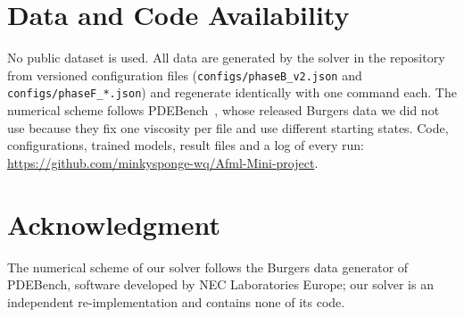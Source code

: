 \section*{Data and Code Availability}
No public dataset is used. All data are generated by the solver in the repository from versioned
configuration files (\texttt{configs/phaseB\_v2.json} and \texttt{configs/phaseF\_*.json}) and regenerate
identically with one command each. The numerical scheme follows PDEBench~\cite{takamoto2022}, whose released
Burgers data we did not use because they fix one viscosity per file and use different starting states.
Code, configurations, trained models, result files and a log of every run:
\url{https://github.com/minkysponge-wq/Afml-Mini-project}.

\section*{Acknowledgment}
The numerical scheme of our solver follows the Burgers data generator of PDEBench, software developed by NEC
Laboratories Europe; our solver is an independent re-implementation and contains none of its code.
